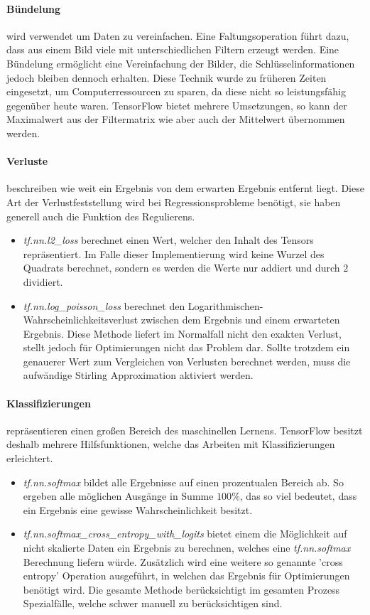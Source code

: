 \paragraph{Bündelung} wird verwendet um Daten zu vereinfachen. 
Eine Faltungsoperation führt dazu, dass aus einem Bild viele mit unterschiedlichen Filtern erzeugt werden.
Eine Bündelung ermöglicht eine Vereinfachung der Bilder, die Schlüsselinformationen jedoch bleiben dennoch erhalten. 
Diese Technik wurde zu früheren Zeiten eingesetzt, um Computerressourcen zu sparen, da diese nicht so leistungsfähig gegenüber heute waren. 
TensorFlow bietet mehrere Umsetzungen, so kann der Maximalwert aus der Filtermatrix wie aber auch der Mittelwert übernommen werden. 

\paragraph{Verluste} beschreiben wie weit ein Ergebnis von dem erwarten Ergebnis entfernt liegt. 
Diese Art der Verlustfeststellung wird bei Regressionsprobleme benötigt, sie haben generell auch die Funktion des Regulierens.
\begin{itemize}
	\item \textit{tf.nn.l2\_loss} berechnet einen Wert, welcher den Inhalt des Tensors repräsentiert. 
	Im Falle dieser Implementierung wird keine Wurzel des Quadrats berechnet, sondern es werden die Werte nur addiert und durch $2$ dividiert.
	\item \textit{tf.nn.log\_poisson\_loss} berechnet den Logarithmischen-Wahrscheinlichkeitsverlust zwischen dem Ergebnis und einem erwarteten Ergebnis. 
	Diese Methode liefert im Normalfall nicht den exakten Verlust, stellt jedoch für Optimierungen nicht das Problem dar. 
	Sollte trotzdem ein genauerer Wert zum Vergleichen von Verlusten berechnet werden, muss die aufwändige Stirling Approximation aktiviert werden. 
\end{itemize}

\paragraph{Klassifizierungen} repräsentieren einen großen Bereich des maschinellen Lernens. 
TensorFlow besitzt deshalb mehrere Hilfsfunktionen, welche das Arbeiten mit Klassifizierungen erleichtert. 
\begin{itemize}
	\item \textit{tf.nn.softmax} bildet alle Ergebnisse auf einen prozentualen Bereich ab. 
	So ergeben alle möglichen Ausgänge in Summe $100\%$, das so viel bedeutet, dass ein Ergebnis eine gewisse Wahrscheinlichkeit besitzt. 
	\item \textit{tf.nn.softmax\_cross\_entropy\_with\_logits} bietet einem die Möglichkeit auf nicht skalierte Daten ein Ergebnis zu berechnen, welches eine \textit{tf.nn.softmax} Berechnung liefern würde. 
	Zusätzlich wird eine weitere so genannte 'cross entropy' Operation ausgeführt, in welchen das Ergebnis für Optimierungen benötigt wird. 
	Die gesamte Methode berücksichtigt im gesamten Prozess Spezialfälle, welche schwer manuell zu berücksichtigen sind. 
\end{itemize}
\phantom \newline


